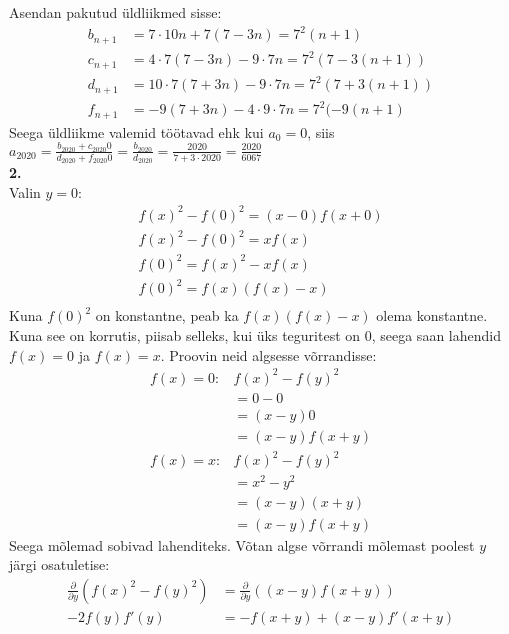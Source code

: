 \documentclass{article}
\begin{document}
Asendan pakutud \"uldliikmed sisse:
\begin{equation*}
\begin{aligned}
b_{n+1}&=7\cdot10n+7(7-3n)=7^2(n+1)\\
c_{n+1}&=4\cdot7(7-3n)-9\cdot7n=7^2(7-3(n+1))\\
d_{n+1}&=10\cdot7(7+3n)-9\cdot7n=7^2(7+3(n+1))\\
f_{n+1}&=-9(7+3n)-4\cdot9\cdot7n=7^2(-9(n+1)
\end{aligned}
\end{equation*}
Seega \"uldliikme valemid t\"o\"otavad ehk kui $a_0=0$, siis $\displaystyle a_{2020}=\frac{b_{2020}+c_{2020}0}{d_{2020}+f_{2020}0}=\frac{b_{2020}}{d_{2020}}=\frac{2020}{7+3\cdot2020}=\frac{2020}{6067}$
\pagebreak\\
\textbf{2.}\\
Valin $y=0$:
\begin{equation*}
\begin{aligned}
f(x)^2-f(0)^2 = (x-0)f(x+0)\\
f(x)^2-f(0)^2 = xf(x)\\
f(0)^2 = f(x)^2-xf(x)\\
f(0)^2 = f(x)(f(x)-x)\\
\end{aligned}
\end{equation*}
Kuna $f(0)^2$ on konstantne, peab ka $f(x)(f(x)-x)$ olema konstantne. Kuna see on korrutis, piisab selleks, kui \"uks teguritest on 0, seega saan lahendid $f(x)=0$ ja $f(x)=x$. Proovin neid algsesse v\~orrandisse:
\begin{equation*}
\begin{aligned}
f(x)=0:& f(x)^2-f(y)^2\\
&=0-0\\
&=(x-y)0\\
&=(x-y)f(x+y)\\
f(x)=x:& f(x)^2-f(y)^2\\
&=x^2-y^2\\
&=(x-y)(x+y)\\
&=(x-y)f(x+y)
\end{aligned}
\end{equation*}
Seega m\~olemad sobivad lahenditeks.
\iffalse
V\~otan algse v\~orrandi m\~olemast poolest $y$ j\"argi osatuletise:
\begin{equation*}
\begin{aligned}
\frac{\partial}{\partial y}\left(f(x)^2-f(y)^2\right)&=\frac{\partial}{\partial y}\left((x-y)f(x+y)\right)\\
-2f(y)f'(y)&=-f(x+y)+(x-y)f'(x+y)\\
\end{aligned}
\end{equation*}
\end{document}
